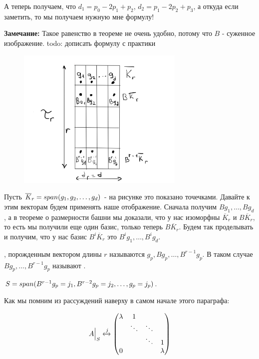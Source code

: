 А теперь получаем, что $d_1 = p_0 - 2p_1 + p_2$, $d_2 = p_1-2p_2 + p_3$, а откуда если заметить, то мы получаем нужную мне формулу!

\textbf{Замечание:} Такое равенство в теореме не очень удобно, потому что $B $ - суженное изображение.  todo: дописать формулу с практики

\begin{figure}
\begin{center}
    \includegraphics[width = 8cm]{assets/7_9-zhordan-table.png}
\end{center}
\end{figure}

Пусть $\overline{K}_r = span(g_1,g_2,\ldots,g_d)$ - на рисунке это показано точечками. Давайте к этим векторам будем применять наше отображение. Сначала получим $Bg_1,\ldots,Bg_d$, а в теореме о размерности башни мы доказали, что у нас изоморфны $\overline{K}_r$ и $B\overline{K}_r$, то есть мы получили еще один базис, только теперь $B\overline{K}_r$. Будем так проделывать и получим, что у нас базис $B^i\overline{K}_r$ это $B^ig_1,\ldots, B^ig_d$.

 , порожденным вектором длины $r$ называются $g_p,Bg_p,\ldots,B^{r-1}g_p$. В таком случае $Bg_p,\ldots,B^{r-1}g_p$ называют .

$S = span (B^{r-1}g_p = j_1, B^{r-2}g_p =j_2 ,\ldots,g_p=j_p)$.

Как мы помним из рассуждений наверху в самом начале этого параграфа:

$$A\Big|_S  \xleftrightarrow{j}\begin{pmatrix}
    \lambda & 1 & &\\
     & \ddots &\ddots &\\
     & & \ddots & 1 \\
     0& &  &\lambda
\end{pmatrix}$$

